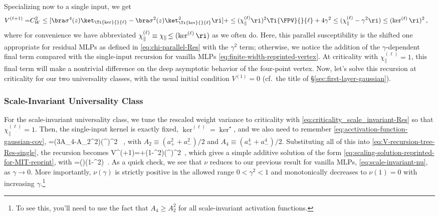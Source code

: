 Specializing now to a single input, 
we get
\begin{align}\label{eq:V-recursion-tree-Res-single}
V^{(\ell+1)}=&C_W^2\le[\bra \sigma^4(z) \ket_{\Ti{\ker}{}{\ell}}-\bra \sigma^2(z) \ket_{\Ti{\ker}{}{\ell}}^2\ri]
+\le(\chi^{(\ell)}_{\parallel}\ri)^2\Ti{\FPV}{}{\ell}
+4\gamma^2
\le(\chi_{\parallel}^{(\ell)}-\gamma^2\ri)
\le(\ker^{(\ell)}\ri)^2
\, ,
\end{align}
where for convenience we have abbreviated  $\chi_{\parallel}^{(\ell)}\equiv \chi_{\parallel}\!\le(\ker^{(\ell)}\ri)$ as we often do.
Here, this parallel susceptibility 
is the shifted one appropriate for residual MLPs as defined in \eqref{eq:chi-parallel-Res} with the $\gamma^2$ term; 
otherwise, %
 we notice the addition of the  $\gamma$-dependent final term compared with the single-input recursion for vanilla MLPs \eqref{eq:finite-width-reprinted-vertex}. At criticality with $\chi_{\parallel}^{(\ell)}=1$, this final term will make a nontrivial difference on the deep asymptotic behavior of the four-point vertex.
Now, let's solve this recursion at criticality for our two universality classes, with the usual initial condition $V^{(1)}=0$ (cf.~the title of \S\ref{sec:first-layer-gaussian}).




\subsubsection{Scale-Invariant Universality Class}
For the scale-invariant universality class, we tune the rescaled weight variance to criticality with \eqref{eq:criticality_scale_invariant-Res} so that $\chi_{\parallel}^{(\ell)}=1$.  
Then, the single-input kernel is exactly fixed, $\ker^{(\ell)}=\ker^{\star}$, 
and we also need to remember \eqref{eq:acctivation-function-gaussian-cov},
\be
\le[\bra \sigma^4\ket_{\ker^{\star}}-\bra \sigma^2\ket_{\ker^{\star}}^2\ri]=(3A_4-A_2^2)\le(\ker^{\star}\ri)^2 \, ,
\ee 
with $A_2\equiv (a_{+}^2+a_{-}^2)/2$ and $A_4\equiv (a_{+}^4+a_{-}^4)/2$. Substituting all of this into \eqref{eq:V-recursion-tree-Res-single}, the recursion becomes
\be\label{eq:V-recursion-tree-Res-single-scale-invariant}
V^{(\ell+1)}=\Ti{\FPV}{}{\ell}+(1-\gamma^2)\le(\ker^{\star}\ri)^2\, ,
\ee
which gives a 
simple additive solution 
of the form \eqref{eq:scaling-solution-reprinted-for-MIT-reprint}, with
\be\label{eq:gamma-nu-scale-invariant}
\nu=\nu(\gamma)\equiv (1-\gamma^2)\, .
\ee
As a quick check, we see that $\nu$ reduces to our previous result for vanilla MLPs, \eqref{eq:scale-invariant-nu}, 
as $\gamma\to0$. More importantly,  $\nu(\gamma)$ is strictly positive in the allowed range $0 < \gamma^2 < 1$ and monotonically decreases to $\nu(1)=0$ with increasing $\gamma$.\footnote{To see this, you'll need to use the fact that
$A_4 \geq A_2^2$ for all scale-invariant activation functions.
}

